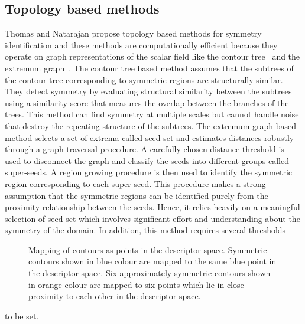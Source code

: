 \documentclass[review,journal]{vgtc}         %
\begin{document}
\subsection{Topology based methods}
Thomas and Natarajan propose topology based methods for symmetry identification and these methods 
are computationally efficient because they operate on graph representations of the scalar field
like the contour tree~\cite{ThomN11} and the extremum graph~\cite{ThomN13}. The contour tree based method 
assumes that the subtrees of the contour tree corresponding to symmetric regions are structurally
similar. They detect symmetry by evaluating structural similarity between the subtrees using a 
similarity score that measures the overlap between the branches of the trees. 
This method can find symmetry at multiple scales but cannot handle
noise that destroy the repeating structure of the subtrees. The extremum 
graph based method selects a set of extrema called seed set and 
estimates distances robustly through a graph traversal procedure. A carefully chosen distance 
threshold is used to disconnect the graph and classify the seeds into different groups called 
super-seeds. A region growing procedure is then used to identify the symmetric region 
corresponding to each super-seed. This procedure makes a strong assumption that the symmetric regions
can be identified purely from the proximity relationship between the seeds. Hence,
it relies heavily on a meaningful selection of seed set which involves significant effort 
and understanding about the symmetry of the domain. In addition, this method requires several thresholds
\begin{figure}[b]
\centering
{
	\caption{\label{ctmap}Mapping of contours as points in the descriptor space. Symmetric contours
		shown in blue colour are mapped to the same blue point in the descriptor space. Six approximately
		symmetric contours shown in orange colour are mapped to six points which lie in close
		proximity to each other in the descriptor space.}
}
\end{figure}
to be set.
\end{document}
